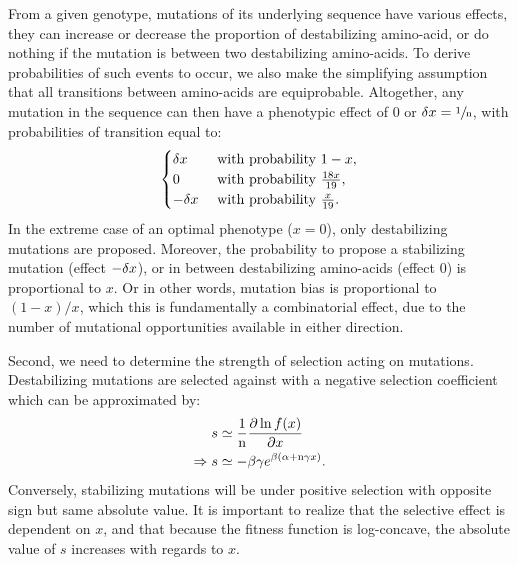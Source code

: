 From a given genotype, mutations of its underlying sequence have various effects, they can increase or decrease the proportion of destabilizing amino-acid, or do nothing if the mutation is between two destabilizing amino-acids.
To derive probabilities of such events to occur, we also make the simplifying assumption that all transitions between amino-acids are equiprobable.
Altogether, any mutation in the sequence can then have a phenotypic effect of $0$ or $\delta x=\sfrac{1}{\text{n}}$, with probabilities of transition equal to:
\begin{gather}
 \begin{cases}
 \dx &\text{ with probability } 1-x, \\
 0 &\text{ with probability } \frac{18 x }{19}, \\
 -\dx &\text{ with probability } \frac{x}{19}.\\
 \end{cases} \label{eq:proba}
\end{gather}
In the extreme case of an optimal phenotype ($x = 0$), only destabilizing mutations are proposed.
Moreover, the probability to propose a stabilizing mutation (effect $-\delta x$), or in between destabilizing amino-acids (effect $0$) is proportional to $x$. 
Or in other words, mutation bias is proportional to $(1-x)/x$, which this is fundamentally a combinatorial effect, due to the number of mutational opportunities available in either direction.

Second, we need to determine the strength of selection acting on mutations.
Destabilizing mutations are selected against with a negative selection coefficient which can be approximated by:
\begin{align}
 s & \simeq \frac{1}{\Nsite}\frac{ \partial \ln f(x) }{\partial x} \label{eq:s} \\
 \Rightarrow s & \simeq - \beta \gamma e^{\beta (\DeltaGmin + \Nsite \gamma x)}. \label{eq:s-unfolded}
\end{align}
Conversely, stabilizing mutations will be under positive selection with opposite sign but same absolute value.
It is important to realize that the selective effect is dependent on $x$, and that because the fitness function is log-concave, the absolute value of $s$ increases with regards to $x$.

